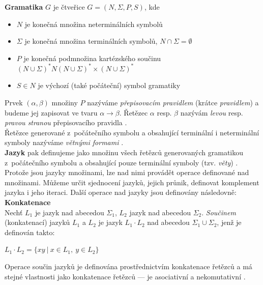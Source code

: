 \textbf{Gramatika} $G$ je čtveřice $G = (N, \Sigma, P, S)$, kde
\begin{itemize}
\item $N$ je konečná množina neterminálních symbolů
\item $\Sigma$ je konečná množina terminálních symbolů, $N \cap \Sigma = \emptyset$
\item $P$ je konečná podmnožina kartézského součinu $(N\cup\Sigma)^*N(N\cup\Sigma)^*\times(N\cup\Sigma)^*$
\item $S \in N$ je výchozí (také počáteční) symbol gramatiky
\end{itemize}
\vspace*{\baselineskip}
Prvek $(\alpha, \beta)$ množiny $P$ nazýváme \textit{přepisovacím pravidlem} (krátce \textit{pravidlem}) a budeme jej zapisovat 
ve tvaru $\alpha \rightarrow \beta$. Řetězec $\alpha$ resp. $\beta$ nazývám \textit{levou} resp. \textit{pravou stranou} přepisovacího 
pravidla \cite[str. 13]{TIN2013}. \\

Řetězce generované z~počátečního symbolu a obsahující terminální i neterminální symboly nazýváme \textit{větnými formami} \cite[str. 15]{TIN2013}. \\

\textbf{Jazyk} pak definujeme jako množinu všech řetězců generovaných gramatikou z~počátečního symbolu a obsahující pouze terminální symboly 
(tzv. \textit{věty}) \cite[str. 15]{TIN2013}. \\

Protože jsou jazyky množinami, lze nad nimi provádět operace definované nad množinami.
Můžeme určit sjednocení jazyků, jejich průnik, definovat komplement jazyka i jeho iteraci. Další operace nad jazyky jsou definovány následovně: \\

\textbf{Konkatenace} \\
Nechť $L_1$ je jazyk nad abecedou $\Sigma_1$, $L_2$ jazyk nad abecedou $\Sigma_2$. \textit{Součinem} (konkatenací) jazyků 
$L_1$ a $L_2$ je jazyk $L_1 \cdot L_2$ nad abecedou $\Sigma_1 \cup \Sigma_2$, jenž je definován takto:
\begin{center}
$L_1 \cdot L_2 = \{xy \ | \ x \in L_1, \ y \in L_2\}$
\end{center}
Operace součin jazyků je definována prostřednictvím konkatenace řetězců a má stejné vlastnosti jako konkatenace řetězců --- je asociativní 
a nekomutativní \cite[str. 10]{TIN2013}. \\

